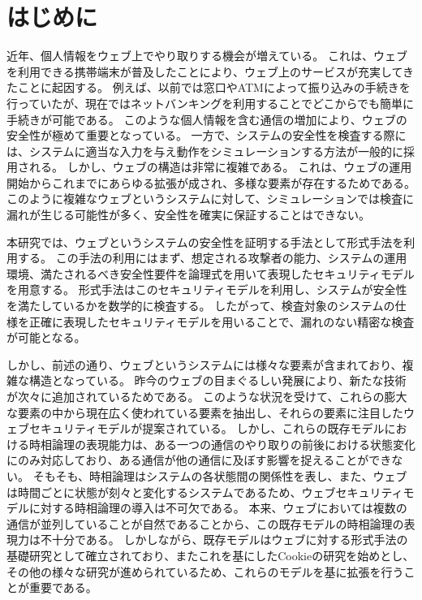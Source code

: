 \documentclass[12pt,a4paper]{jbook}
\begin{document}
\newpage

\chapter{はじめに}
近年、個人情報をウェブ上でやり取りする機会が増えている。
これは、ウェブを利用できる携帯端末が普及したことにより、ウェブ上のサービスが充実してきたことに起因する。
例えば、以前では窓口やATMによって振り込みの手続きを行っていたが、現在ではネットバンキングを利用することでどこからでも簡単に手続きが可能である。
このような個人情報を含む通信の増加により、ウェブの安全性が極めて重要となっている。
一方で、システムの安全性を検査する際には、システムに適当な入力を与え動作をシミュレーションする方法が一般的に採用される。
しかし、ウェブの構造は非常に複雑である。
これは、ウェブの運用開始からこれまでにあらゆる拡張が成され、多様な要素が存在するためである。
このように複雑なウェブというシステムに対して、シミュレーションでは検査に漏れが生じる可能性が多く、安全性を確実に保証することはできない。

本研究では、ウェブというシステムの安全性を証明する手法として形式手法を利用する。
この手法の利用にはまず、想定される攻撃者の能力、システムの運用環境、満たされるべき安全性要件を論理式を用いて表現したセキュリティモデルを用意する。
形式手法はこのセキュリティモデルを利用し、システムが安全性を満たしているかを数学的に検査する。
\color{red}
したがって、検査対象のシステムの仕様を正確に表現したセキュリティモデルを用いることで、漏れのない精密な検査が可能となる。
\color{black}

しかし、前述の通り、ウェブというシステムには様々な要素が含まれており、複雑な構造となっている。
昨今のウェブの目まぐるしい発展により、新たな技術が次々に追加されているためである。
このような状況を受けて、これらの膨大な要素の中から現在広く使われている要素を抽出し、それらの要素に注目したウェブセキュリティモデルが提案されている\cite{based-model,cookie-model}。
しかし、これらの既存モデルにおける時相論理の表現能力は、ある一つの通信のやり取りの前後における状態変化にのみ対応しており、ある通信が他の通信に及ぼす影響を捉えることができない。
そもそも、時相論理はシステムの各状態間の関係性を表し、また、ウェブは時間ごとに状態が刻々と変化するシステムであるため、ウェブセキュリティモデルに対する時相論理の導入は不可欠である。
本来、ウェブにおいては複数の通信が並列していることが自然であることから、この既存モデルの時相論理の表現力は不十分である。
しかしながら、既存モデル\cite{based-model}はウェブに対する形式手法の基礎研究として確立されており、またこれを基にしたCookieの研究\cite{cookie-model}を始めとし、その他の様々な研究\cite{chaitanya2017formal, bagheri2016practical, chen2015aspire, nelson2013aluminum, somorovsky2011all}が進められているため、これらのモデルを基に拡張を行うことが重要である。
\end{document}

